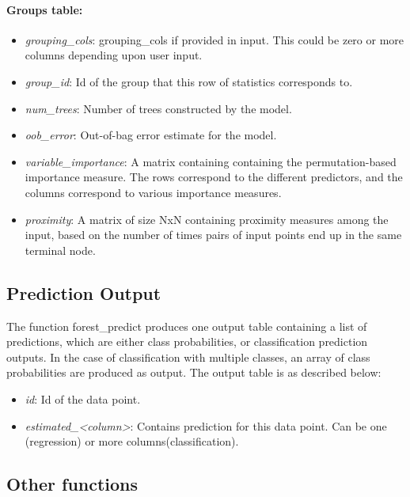 \paragraph{Groups table:}

\begin{itemize}
    \item \emph{grouping\_cols}: grouping\_cols if provided in input. This could be zero or 
    more columns depending upon user input.
    \item \emph{group\_id}: Id of the group that this row of statistics corresponds to.   
    \item \emph{num\_trees}: Number of trees constructed by the model.
    \item \emph{oob\_error}: Out-of-bag error estimate for the model.
    \item \emph{variable\_importance}: A matrix containing containing the permutation-based importance measure.
    The rows correspond to the different predictors, and the columns correspond to various importance measures.
    \item \emph{proximity}: A matrix of size NxN containing proximity measures among the input, based
    on the number of times pairs of input points end up in the same terminal node.
\end{itemize}

\subsection{Prediction Output}
\label{sub:prediction_out}
The function forest\_predict produces one output table containing a list of predictions, which 
are either class probabilities, or classification prediction outputs. In the case of 
classification with multiple classes, an array of class probabilities are produced as output.
The output table is as described below:

\begin{itemize}
    \item \emph{id}: Id of the data point.
    \item \emph{estimated\_<column>}: Contains prediction for this data point. Can be one (regression)
    or more columns(classification).
\end{itemize}

\subsection{Other functions}
\label{sub:others}
